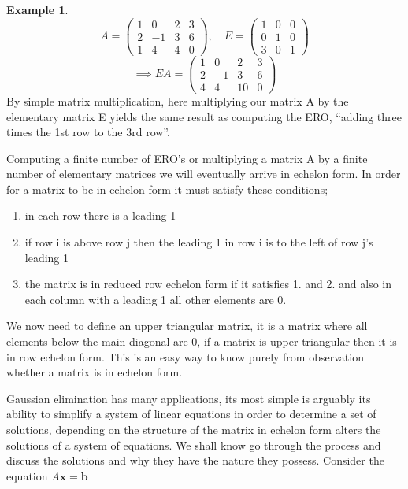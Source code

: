 \documentclass[12pt,reqno,twoside,titlepage]{article}
\theoremstyle{definition}
\newtheorem{exmp}{Example}[section]
\begin{document}
\begin{exmp}
\begin{equation*}
 A = 
\begin{pmatrix}
 1 & 0 & 2 & 3 \\
 2 & -1 & 3 & 6 \\
 1 & 4 & 4 & 0
\end{pmatrix}
   ,
  \quad
  E = 
\begin{pmatrix}
1 & 0 & 0 \\
0 & 1 & 0 \\
3 & 0 & 1
\end{pmatrix}
\end{equation*}
\newline
\begin{equation*}
\implies EA = 
\begin{pmatrix}
1 & 0 & 2 & 3 \\
2 & -1 & 3 & 6 \\
4 & 4 & 10 & 0
\end{pmatrix}
\end{equation*}
\newline
By simple matrix multiplication, here multiplying our matrix A by the elementary matrix E yields the same result as computing the ERO, “adding three times the 1st row to the 3rd row”.
\end{exmp}

Computing a finite number of ERO’s or multiplying a matrix A by a finite number of elementary matrices we will eventually arrive in echelon form. In order for a matrix to be in echelon form it must satisfy these conditions;

\begin{enumerate}
    \item in each row there is a leading 1
    \item if row i is above row j then the leading 1 in row i is to the left of row j’s leading 1
    \item the matrix is in reduced row echelon form if it satisfies 1. and 2. and also in each column with a leading 1 all other elements are 0.
\end{enumerate}

We now need to define an upper triangular matrix, it is a matrix where all elements below the main diagonal are 0, if a matrix is upper triangular then it is in row echelon form. This is an easy way to know purely from observation whether a matrix is in echelon form.

Gaussian elimination has many applications, its most simple is arguably its ability to simplify a system of linear equations in order to determine a set of solutions, depending on the structure of the matrix in echelon form alters the solutions of a system of equations. We shall know go through the process and discuss the solutions and why they have the nature they possess. Consider the equation $A\textbf{x} = \textbf{b}$
\end{document}
